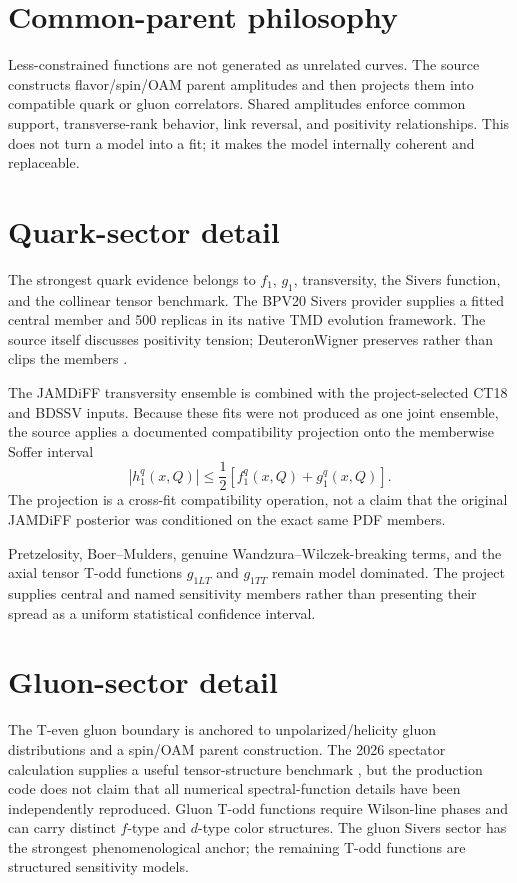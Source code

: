 \documentclass[11pt,oneside]{book}
\begin{document}
\section{Common-parent philosophy}

Less-constrained functions are not generated as unrelated curves.  The source constructs flavor/spin/OAM parent amplitudes and then projects them into compatible quark or gluon correlators.  Shared amplitudes enforce common support, transverse-rank behavior, link reversal, and positivity relationships.  This does not turn a model into a fit; it makes the model internally coherent and replaceable.

\section{Quark-sector detail}

The strongest quark evidence belongs to $f_1$, $g_1$, transversity, the Sivers function, and the collinear tensor benchmark.  The BPV20 Sivers provider supplies a fitted central member and 500 replicas in its native TMD evolution framework.  The source itself discusses positivity tension; DeuteronWigner preserves rather than clips the members \cite{BuryProkudinVladimirov2021}.

The JAMDiFF transversity ensemble is combined with the project-selected CT18 and BDSSV inputs.  Because these fits were not produced as one joint ensemble, the source applies a documented compatibility projection onto the memberwise Soffer interval
\begin{equation}
 |h_1^q(x,Q)|\leq\frac12\left[f_1^q(x,Q)+g_1^q(x,Q)\right].
 \label{eq:soffer}
\end{equation}
The projection is a cross-fit compatibility operation, not a claim that the original JAMDiFF posterior was conditioned on the exact same PDF members.

Pretzelosity, Boer--Mulders, genuine Wandzura--Wilczek-breaking terms, and the axial tensor T-odd functions $g_{1LT}$ and $g_{1TT}$ remain model dominated.  The project supplies central and named sensitivity members rather than presenting their spread as a uniform statistical confidence interval.

\section{Gluon-sector detail}

The T-even gluon boundary is anchored to unpolarized/helicity gluon distributions and a spin/OAM parent construction.  The 2026 spectator calculation supplies a useful tensor-structure benchmark \cite{XieChenLu2026}, but the production code does not claim that all numerical spectral-function details have been independently reproduced.  Gluon T-odd functions require Wilson-line phases and can carry distinct $f$-type and $d$-type color structures.  The gluon Sivers sector has the strongest phenomenological anchor; the remaining T-odd functions are structured sensitivity models.
\end{document}
